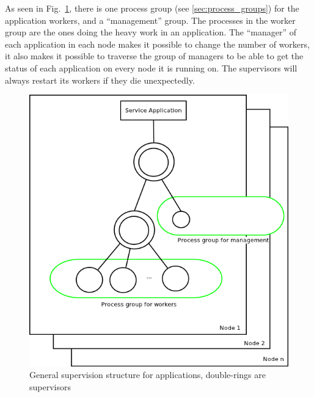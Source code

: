 \documentclass[11pt,a4paper]{report}
\begin{document}
As seen in Fig.~\ref{fig:service_app}, there is one process group
(see \ref{sec:process_groups}) for the application workers, and a ``management''
group. The processes in the worker group are the ones doing the heavy work in an
application. The ``manager'' of each application in each node makes it
possible to change the number of workers, it also makes it possible to traverse
the group of managers to be able to get the status of each application on every
node it is running on. The supervisors will always restart its workers if they
die unexpectedly.
\begin{figure}[h]
 \centering
 \includegraphics[width=\textwidth]{./graphics/Service_Application.png}
 \caption{General supervision structure for applications, double-rings are
supervisors}
 \label{fig:service_app}
\end{figure}
\end{document}

